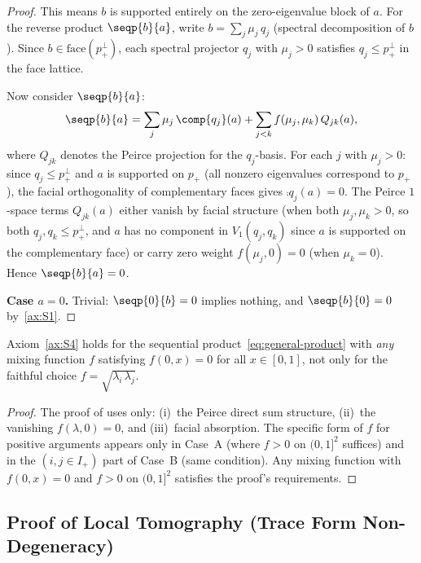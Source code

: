 \begin{proof}
This means $b$ is supported entirely on the zero-eigenvalue block of
$a$.  For the reverse product $\seqp{b}{a}$, write
$b = \sum_{j} \mu_{j}\, q_{j}$ (spectral decomposition of $b$).
Since $b \in \mathrm{face}(p_{+}^{\perp})$, each spectral
projector $q_{j}$ with $\mu_{j} > 0$ satisfies
$q_{j} \leq p_{+}^{\perp}$ in the face lattice.

Now consider $\seqp{b}{a}$:
\[
  \seqp{b}{a} = \sum_{j} \mu_{j}\, \comp{q_{j}}(a)
  + \sum_{j < k} f(\mu_{j}, \mu_{k})\, Q_{jk}(a),
\]
where $Q_{jk}$ denotes the Peirce projection for the $q_{j}$-basis.
For each $j$ with $\mu_{j} > 0$: since $q_{j} \leq p_{+}^{\perp}$
and $a$ is supported on $p_{+}$ (all nonzero eigenvalues correspond to
$p_{+}$), the facial orthogonality of complementary faces gives
$\comp{q_{j}}(a) = 0$.  The Peirce $1$-space terms $Q_{jk}(a)$ either
vanish by facial structure (when both $\mu_{j}, \mu_{k} > 0$,
so both $q_{j}, q_{k} \leq p_{+}^{\perp}$, and $a$ has no component
in $V_{1}(q_{j}, q_{k})$ since $a$ is supported on the complementary
face) or carry zero weight $f(\mu_{j}, 0) = 0$ (when $\mu_{k} = 0$).
Hence $\seqp{b}{a} = 0$.

\medskip
\noindent\textbf{Case $a = 0$.}  Trivial: $\seqp{0}{b} = 0$ implies
nothing, and $\seqp{b}{0} = 0$ by~\ref{ax:S1}.
\end{proof}

\begin{corollary}
\label{cor:S4-phi-indep}
Axiom~\ref{ax:S4} holds for the sequential
product~\eqref{eq:general-product} with \emph{any} mixing function $f$
satisfying $f(0, x) = 0$ for all $x \in [0,1]$, not only for the
faithful choice $f = \sqrt{\lambda_{i}\, \lambda_{j}}$.
\end{corollary}

\begin{proof}
The proof of  uses only: (i)~the Peirce direct sum
structure, (ii)~the vanishing $f(\lambda, 0) = 0$, and (iii)~facial
absorption.  The specific form of $f$ for positive arguments appears
only in Case~A (where $f > 0$ on $(0,1]^{2}$ suffices) and in the
$(i, j \in I_{+})$ part of Case~B (same condition).  Any mixing
function with $f(0, x) = 0$ and $f > 0$ on $(0,1]^{2}$ satisfies the
proof's requirements.
\end{proof}


\subsection{Proof of Local Tomography (Trace Form Non-Degeneracy)}
\label{app:lt-proof}

